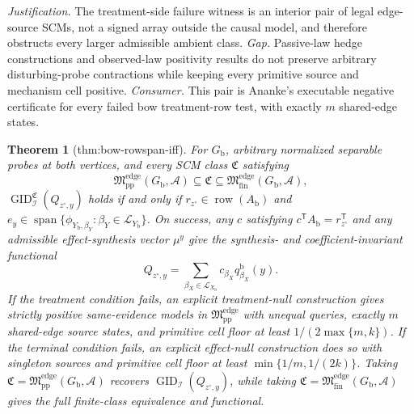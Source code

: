 \documentclass{article}
\newtheorem{theorem}{Theorem}
\begin{document}
\par\smallskip\noindent \textit{Justification.} The treatment-side failure witness is an interior pair of legal edge-source SCMs, not a signed array outside the causal model, and therefore obstructs every larger admissible ambient class. \textit{Gap.} Passive-law hedge constructions and observed-law positivity results do not preserve arbitrary disturbing-probe contractions while keeping every primitive source and mechanism cell positive. \textit{Consumer.} This pair is Ananke's executable negative certificate for every failed bow treatment-row test, with exactly \(m\) shared-edge states.

\begin{theorem}[thm:bow-rowspan-iff]\label{thm:bow-rowspan-iff}
For \(G_{\mathrm b}\), arbitrary normalized separable probes at both vertices, and every SCM class \(\mathfrak C\) satisfying
\[
\mathfrak M_{\mathrm{pp}}^{\mathrm{edge}}(G_{\mathrm b},\mathcal A)
\subseteq\mathfrak C
\subseteq\mathfrak M_{\mathrm{fin}}^{\mathrm{edge}}(G_{\mathrm b},\mathcal A),
\]
\(\operatorname{GID}_{\mathcal I}^{\mathfrak C}(Q_{z^{\circ},y})\) holds if and only if \(r_{z^{\circ}}\in\operatorname{row}(A_{\mathrm b})\) and \(e_y\in\operatorname{span}\{\phi_{Y_{\mathrm b},\beta_Y}:\beta_Y\in\mathcal L_{Y_{\mathrm b}}\}\).  On success, any \(c\) satisfying \(c^{\mathsf T}A_{\mathrm b}=r_{z^{\circ}}^{\mathsf T}\) and any admissible effect-synthesis vector \(\mu^y\) give the synthesis- and coefficient-invariant functional
\[
Q_{z^{\circ},y}=\sum_{\beta_X\in\mathcal L_{X_{\mathrm b}}}c_{\beta_X}q^{\mathrm b}_{\beta_X}(y).
\]
If the treatment condition fails, an explicit treatment-null construction gives strictly positive same-evidence models in \(\mathfrak M_{\mathrm{pp}}^{\mathrm{edge}}\) with unequal queries, exactly \(m\) shared-edge source states, and primitive cell floor at least \(1/(2\max\{m,k\})\).  If the terminal condition fails, an explicit effect-null construction does so with singleton sources and primitive cell floor at least \(\min\{1/m,1/(2k)\}\).  Taking \(\mathfrak C=\mathfrak M_{\mathrm{pp}}^{\mathrm{edge}}(G_{\mathrm b},\mathcal A)\) recovers \(\operatorname{GID}_{\mathcal I}(Q_{z^{\circ},y})\), while taking \(\mathfrak C=\mathfrak M_{\mathrm{fin}}^{\mathrm{edge}}(G_{\mathrm b},\mathcal A)\) gives the full finite-class equivalence and functional.
\end{theorem}
\end{document}
